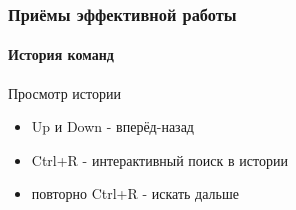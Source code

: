 \begin{frame}
  \frametitle{Приёмы эффективной работы}
  \framesubtitle{История команд}

  \Large{\alert{Просмотр истории}}

  \begin{itemize}
    \item \textquotedbl Up \textquotedbl и \textquotedbl Down \textquotedbl - вперёд-назад \pause
    \item \textquotedbl Ctrl+R \textquotedbl - интерактивный поиск в истории \pause
    \item повторно \textquotedbl Ctrl+R \textquotedbl - искать дальше
  \end{itemize}
\end{frame}
